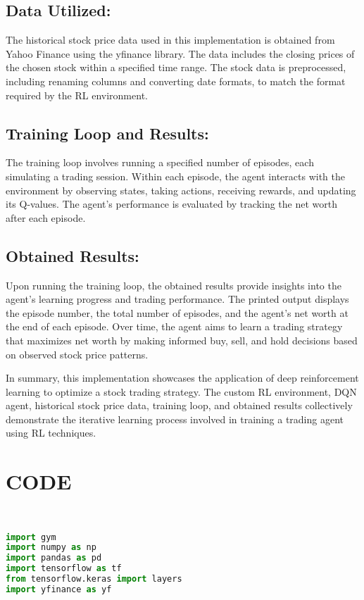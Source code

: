 \documentclass{article}
\begin{document}
\subsection{Data Utilized:}
The historical stock price data used in this implementation is obtained from Yahoo Finance using the yfinance library. The data includes the closing prices of the chosen stock within a specified time range. The stock data is preprocessed, including renaming columns and converting date formats, to match the format required by the RL environment.

\subsection{ Training Loop and Results:}
The training loop involves running a specified number of episodes, each simulating a trading session. Within each episode, the agent interacts with the environment by observing states, taking actions, receiving rewards, and updating its Q-values. The agent's performance is evaluated by tracking the net worth after each episode.

\subsection{ Obtained Results:}
Upon running the training loop, the obtained results provide insights into the agent's learning progress and trading performance. The printed output displays the episode number, the total number of episodes, and the agent's net worth at the end of each episode. Over time, the agent aims to learn a trading strategy that maximizes net worth by making informed buy, sell, and hold decisions based on observed stock price patterns.

In summary, this implementation showcases the application of deep reinforcement learning to optimize a stock trading strategy. The custom RL environment, DQN agent, historical stock price data, training loop, and obtained results collectively demonstrate the iterative learning process involved in training a trading agent using RL techniques.




\section{CODE}

\begin{lstlisting}[language=Python]


import gym
import numpy as np
import pandas as pd
import tensorflow as tf
from tensorflow.keras import layers
import yfinance as yf
\end{lstlisting}
\end{document}
